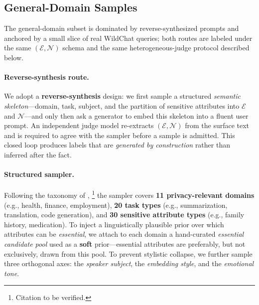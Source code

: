 \subsection{General-Domain Samples}
\label{sec:data:reverse}

The general-domain subset is dominated by reverse-synthesized prompts
and anchored by a small slice of real WildChat queries; both routes
are labeled under the same $(\mathcal{E},\mathcal{N})$ schema and
the same heterogeneous-judge protocol described below.

\paragraph{Reverse-synthesis route.}
We adopt a \textbf{reverse-synthesis} design: we first sample
a structured \emph{semantic skeleton}---domain, task, subject, and
the partition of sensitive attributes into $\mathcal{E}$ and
$\mathcal{N}$---and only then ask a generator to embed this skeleton
into a fluent user prompt. An independent judge model re-extracts
$(\mathcal{E},\mathcal{N})$ from the surface text and is required to
agree with the sampler before a sample is admitted. This closed loop
produces labels that are \emph{generated by construction} rather than
inferred after the fact.

\paragraph{Structured sampler.}
Following the taxonomy of \citet{ngong2025contextual},%
\footnote{Citation to be verified.}
the sampler covers \textbf{11 privacy-relevant domains} (e.g., health,
finance, employment), \textbf{20 task types} (e.g., summarization,
translation, code generation), and \textbf{30 sensitive attribute
types} (e.g., family history, medication). To inject a linguistically
plausible prior over which attributes can be \emph{essential}, we
attach to each domain a hand-curated \emph{essential candidate pool}
used as a \textbf{soft} prior---essential attributes are preferably,
but not exclusively, drawn from this pool. To prevent stylistic
collapse, we further sample three orthogonal axes: the
\emph{speaker subject}, the \emph{embedding style}, and the
\emph{emotional tone}.

